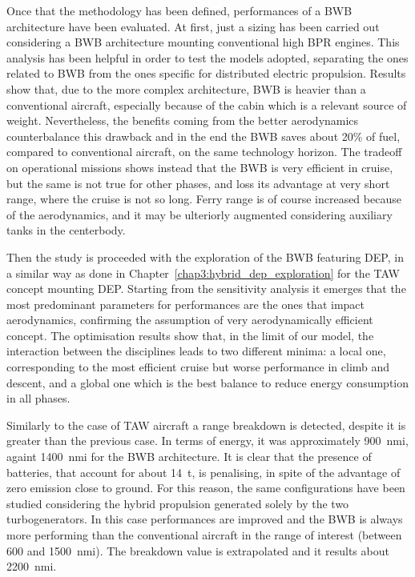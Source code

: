 Once that the methodology has been defined, performances of a BWB architecture have been evaluated. 
At first, just a sizing has been carried out considering a BWB architecture mounting conventional high BPR engines. 
This analysis has been helpful in order to test the models adopted, separating the ones related to BWB from the ones specific for distributed electric propulsion. 
Results show that, due to the more complex architecture, BWB is heavier than a conventional aircraft, especially because of the cabin which is a relevant source of weight. 
Nevertheless, the benefits coming from the better aerodynamics counterbalance this drawback and in the end the BWB saves about 20\% of fuel, compared to conventional aircraft, on the same technology horizon. 
The tradeoff on operational missions shows instead that the BWB is very efficient in cruise, but the same is not true for other phases, and loss its advantage at very short range, where the cruise is not so long. 
Ferry range is of course increased because of the aerodynamics, and it may be ulteriorly augmented considering auxiliary tanks in the centerbody. 

Then the study is proceeded with the exploration of the BWB featuring DEP, in a similar way as done in Chapter~\ref{chap3:hybrid_dep_exploration} for the TAW concept mounting DEP. 
Starting from the sensitivity analysis it emerges that the most predominant parameters for performances are the ones that impact aerodynamics, confirming the assumption of very aerodynamically efficient concept. 
The optimisation results show that, in the limit of our model, the interaction between the disciplines leads to two different minima: a local one, corresponding to the most efficient cruise but worse performance in climb and descent, and a global one which is the best balance to reduce energy consumption in all phases. 

Similarly to the case of TAW aircraft a range breakdown is detected, despite it is greater than the previous case. 
In terms of energy, it was approximately 900~nmi, againt 1400~nmi for the BWB architecture. 
It is clear that the presence of batteries, that account for about 14~\si{\tonne}, is penalising, in spite of the advantage of zero emission close to ground. 
For this reason, the same configurations have been studied considering the hybrid propulsion generated solely by the two turbogenerators. 
In this case performances are improved and the BWB is always more performing than the conventional aircraft in the range of interest (between 600 and 1500~nmi).
The breakdown value is extrapolated and it results about 2200~nmi. 

